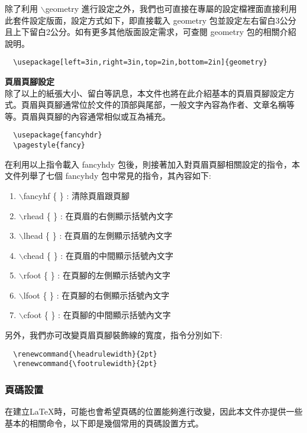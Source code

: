 除了利用  {\A $\backslash$geometry} 進行設定之外，我們也可直接在專屬的設定檔裡面直接利用此套件設定版面，設定方式如下，即直接載入 geometry 包並設定左右留白3公分且上下留白2公分。如有更多其他版面設定需求，可查閱 geometry 包的相關介紹說明。

\bigskip
	\begin{lstlisting}
  \usepackage[left=3in,right=3in,top=2in,bottom=2in]{geometry} 
	\end{lstlisting}
\bigskip

\textbf{頁眉頁腳設定}\\
除了以上的紙張大小、留白等訊息，本文件也將在此介紹基本的頁眉頁腳設定方式。頁眉與頁腳通常位於文件的頂部與尾部，一般文字內容為作者、文章名稱等等。頁眉與頁腳的內容通常相似或互為補充。
\bigskip
\begin{lstlisting}
  \usepackage{fancyhdr}
  \pagestyle{fancy}
\end{lstlisting}

在利用以上指令載入 fancyhdy 包後，則接著加入對頁眉頁腳相關設定的指令，本文件列舉了七個 fancyhdy 包中常見的指令，其內容如下:

\begin{enumerate}
\item {\A $\backslash$fancyhf \{ \}} : 清除頁眉跟頁腳
\item {\A $\backslash$rhead \{ \}} : 在頁眉的右側顯示括號內文字
\item {\A $\backslash$lhead \{ \}} : 在頁眉的左側顯示括號內文字
\item {\A $\backslash$chead \{ \}} : 在頁眉的中間顯示括號內文字
\item {\A $\backslash$rfoot \{ \}} : 在頁腳的左側顯示括號內文字
\item {\A $\backslash$lfoot \{ \}} : 在頁腳的右側顯示括號內文字
\item {\A $\backslash$cfoot \{ \}} : 在頁腳的中間顯示括號內文字
\end{enumerate}

另外，我們亦可改變頁眉頁腳裝飾線的寬度，指令分別如下:
\bigskip
\begin{lstlisting}
  \renewcommand{\headrulewidth}{2pt}
  \renewcommand{\footrulewidth}{2pt}
\end{lstlisting}


\subsubsection{頁碼設置}
在建立\LaTeX 時，可能也會希望頁碼的位置能夠進行改變，因此本文件亦提供一些基本的相關命令，以下即是幾個常用的頁碼設置方式。

